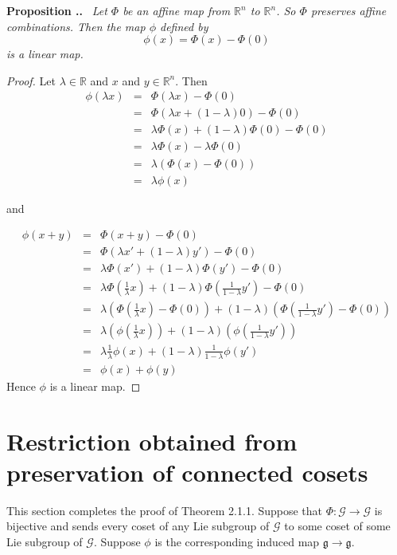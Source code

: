 \documentclass[honours]{UNSWthesis}
\newcommand{\R}{\mathbb{R}}
\newcommand{\G}{\mathcal{G}}
\newcommand{\g}{\mathfrak{g}}
\newcommand{\1}{\mathbf{e}_{1}}
\newcommand{\2}{\mathbf{e}_{3}}
\newcommand{\3}{\mathbf{e}_{3}}
\newcounter{Item}[section]
\newenvironment{Proposition}{\medskip
                            \refstepcounter{Item}
                            \noindent
                           {\bf Proposition \thesection.\theItem.}\ %
                            \begingroup \sl}
                           {\endgroup\medskip}
\begin{document}
\begin{Proposition}
Let $\Phi$ be an affine map from $\R^{n}$ to $\R^{n}$. So $\Phi$ preserves affine combinations. Then the map $\phi$ defined by 
\[
\phi(x)=\Phi(x)-\Phi(0)
\]
is a linear map.
\end{Proposition}

\begin{proof}
Let $\lambda \in \R$ and $x$ and $y \in \R^{n}$. Then 
\begin{eqnarray*}
\phi(\lambda x) &=& \Phi(\lambda x) - \Phi(0) \\
&=& \Phi(\lambda x +(1-\lambda)0)-\Phi(0) \\
&=& \lambda \Phi(x)+(1-\lambda)\Phi(0) -\Phi(0) \\
&=& \lambda \Phi(x)-\lambda\Phi(0) \\
&=& \lambda (\Phi(x)-\Phi(0)) \\
&=& \lambda \phi(x) 
\end{eqnarray*}

and

\begin{eqnarray*}
\phi(x+y) &=& \Phi(x+y)-\Phi(0) \\
&=& \Phi(\lambda x' + (1-\lambda)y') -\Phi(0) \\
&=& \lambda \Phi( x') + (1-\lambda)\Phi(y') -\Phi(0) \\
&=& \lambda \Phi(\frac{1}{\lambda} x) + (1-\lambda)\Phi(\frac{1}{1-\lambda} y') -\Phi(0) \\
&=& \lambda (\Phi(\frac{1}{\lambda} x) -\Phi(0)) + (1-\lambda)(\Phi(\frac{1}{1-\lambda} y')-\Phi(0))  \\
&=& \lambda (\phi(\frac{1}{\lambda} x) ) + (1-\lambda)(\phi(\frac{1}{1-\lambda} y'))  \\
&=& \lambda \frac{1}{\lambda} \phi( x)  + (1-\lambda)\frac{1}{1-\lambda} \phi( y')  \\
&=& \phi(x)+\phi(y)
\end{eqnarray*}
Hence $\phi$ is a linear map.
\end{proof} 



\section{Restriction obtained from preservation of connected cosets}
This section completes the proof of Theorem 2.1.1. 
Suppose that $\Phi: \G \longrightarrow \G$ is bijective and sends every coset of any Lie subgroup of $\G$ to some coset of some Lie subgroup of $\G$. Suppose $\phi$ is the corresponding induced map $\g \longrightarrow \g$. 
\end{document}
